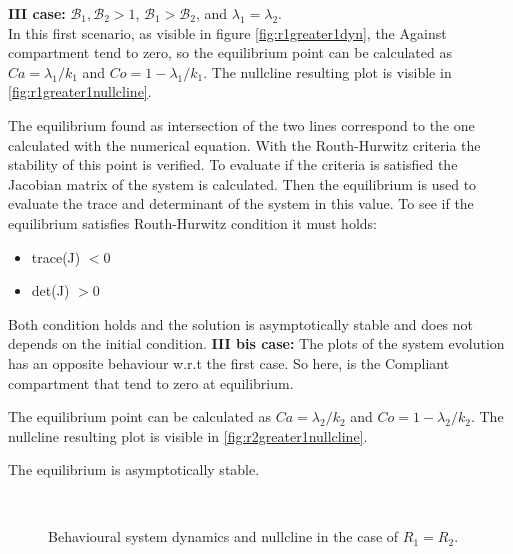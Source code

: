 \textbf{III case:} $\mathcal{B}_1, \mathcal{B}_2 >1$, $\mathcal{B}_1 >  \mathcal{B}_2$, and $\lambda_1 = \lambda_2$. \\
In this first scenario, as visible in figure \ref{fig:r1greater1dyn}, the Against compartment tend to zero, so the equilibrium point can be calculated as $Ca = \lambda_1/k_1$ and $Co = 1 - \lambda_1/k_1 $. 
The nullcline resulting plot is visible in \ref{fig:r1greater1nullcline}. 

The equilibrium found as intersection of the two lines correspond to the one calculated with the numerical equation. With the Routh-Hurwitz criteria the stability of this point is verified. To evaluate if the criteria is satisfied the Jacobian matrix of the system is calculated. Then the equilibrium is used to evaluate the trace and determinant of the system in this value. To see if the equilibrium satisfies Routh-Hurwitz condition it must holds:
\begin{itemize}
	\item trace(J) $< 0$
	\item det(J) $> 0$
\end{itemize}
Both condition holds and the solution is asymptotically stable and does not depends on the initial condition.
\textbf{III bis case:}
The plots of the system evolution has an opposite behaviour w.r.t the first case. So here, is the Compliant compartment that tend to zero at equilibrium. 

The equilibrium point can be calculated as $Ca = \lambda_2/k_2$ and $Co = 1 - \lambda_2/k_2$. 
The nullcline resulting plot is visible in \ref{fig:r2greater1nullcline}. 

The equilibrium is asymptotically stable. 
\begin{figure}[h]
	\centering
	 \quad
	 \\
	\caption[Behavioural model fourth case]{Behavioural system dynamics and nullcline in the case of   $R_1 = R_2$.}
	\label{fig:r1r2equaldyn}
\end{figure}


